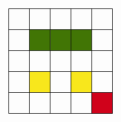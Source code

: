 \documentclass[12pt]{article}
\begin{document}
\begin{itemize}[align=left]
\[\begin{tikzpicture}[x=0.75pt,y=0.75pt,yscale=-1,xscale=1]
        \draw  [draw opacity=0][fill={rgb, 255:red, 208; green, 2; blue, 27 }  ,fill opacity=1 ] (410,210) -- (390,210) -- (390,190) -- (410,190) -- cycle ;
        \draw  [draw opacity=0][fill={rgb, 255:red, 248; green, 231; blue, 28 }  ,fill opacity=1 ] (390,190) -- (370,190) -- (370,170) -- (390,170) -- cycle ;
        \draw  [draw opacity=0][fill={rgb, 255:red, 248; green, 231; blue, 28 }  ,fill opacity=1 ] (350,190) -- (330,190) -- (330,170) -- (350,170) -- cycle ;
        \draw  [draw opacity=0][fill={rgb, 255:red, 65; green, 117; blue, 5 }  ,fill opacity=1 ] (390,150) -- (370,150) -- (370,130) -- (390,130) -- cycle ;
        \draw  [draw opacity=0][fill={rgb, 255:red, 65; green, 117; blue, 5 }  ,fill opacity=1 ] (370,150) -- (350,150) -- (350,130) -- (370,130) -- cycle ;
        \draw  [draw opacity=0][fill={rgb, 255:red, 65; green, 117; blue, 5 }  ,fill opacity=1 ] (350,150) -- (330,150) -- (330,130) -- (350,130) -- cycle ;
        \draw  [draw opacity=0] (410,210) -- (310,210) -- (310,110) -- (410,110) -- cycle ; \draw   (390,210) -- (390,110)(370,210) -- (370,110)(350,210) -- (350,110)(330,210) -- (330,110) ; \draw   (410,190) -- (310,190)(410,170) -- (310,170)(410,150) -- (310,150)(410,130) -- (310,130) ; \draw   (410,210) -- (310,210) -- (310,110) -- (410,110) -- cycle ;
        

\end{tikzpicture}\]
\end{itemize}
\end{document}
